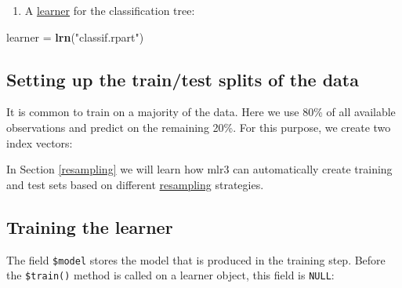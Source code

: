 \documentclass[]{scrbook}
\newenvironment{Shaded}{\begin{snugshade}}{\end{snugshade}}
\newcommand{\FloatTok}[1]{\textcolor[rgb]{0.00,0.00,0.81}{#1}}
\newcommand{\KeywordTok}[1]{\textcolor[rgb]{0.13,0.29,0.53}{\textbf{#1}}}
\newcommand{\NormalTok}[1]{#1}
\newcommand{\OperatorTok}[1]{\textcolor[rgb]{0.81,0.36,0.00}{\textbf{#1}}}
\newcommand{\StringTok}[1]{\textcolor[rgb]{0.31,0.60,0.02}{#1}}
\providecommand{\tightlist}{%
  \setlength{\itemsep}{0pt}\setlength{\parskip}{0pt}}
\renewenvironment{Shaded} {\begin{snugshade}\small} {\end{snugshade}}
\begin{document}
\begin{enumerate}
\def\labelenumi{\arabic{enumi}.}
\setcounter{enumi}{1}
\tightlist
\item
  A \protect\hyperlink{learners}{learner} for the classification tree:
\end{enumerate}

\begin{Shaded}
\begin{Highlighting}[]
\NormalTok{learner =}\StringTok{ }\KeywordTok{lrn}\NormalTok{(}\StringTok{"classif.rpart"}\NormalTok{)}
\end{Highlighting}
\end{Shaded}

\hypertarget{split-data}{%
\subsection{Setting up the train/test splits of the data}\label{split-data}}

It is common to train on a majority of the data.
Here we use 80\% of all available observations and predict on the remaining 20\%.
For this purpose, we create two index vectors:

\begin{Shaded}
\end{Shaded}

In Section \ref{resampling} we will learn how mlr3 can automatically create training and test sets based on different \protect\hyperlink{resampling}{resampling} strategies.

\hypertarget{training}{%
\subsection{Training the learner}\label{training}}

The field \texttt{\$model} stores the model that is produced in the training step.
Before the \texttt{\$train()} method is called on a learner object, this field is \texttt{NULL}:

\begin{Shaded}
\end{Shaded}
\end{document}
